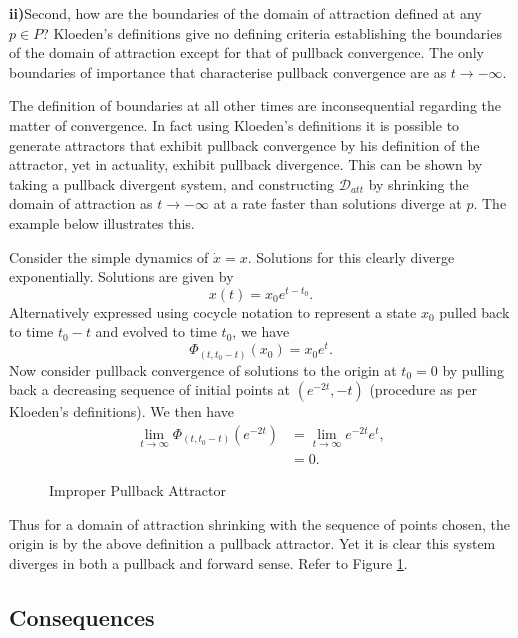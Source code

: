 \documentclass{article}
\begin{document}
\textbf{ii)}Second, how are the boundaries of the domain of attraction defined
at any $p \in P$? Kloeden's definitions give no defining criteria
establishing the boundaries of the domain of attraction except for that of
pullback convergence. The only boundaries of importance that characterise
pullback convergence are as $t \to -\infty$.

The definition of boundaries at all other times are
inconsequential regarding the matter of convergence. In fact using
Kloeden's definitions it is possible to generate attractors that
exhibit pullback convergence by his definition of the attractor,
yet in actuality, exhibit pullback divergence. This can be shown
by taking a pullback divergent system, and constructing
$\mathcal{D}_{att}$ by shrinking the domain of attraction as $t\to
-\infty$ at a rate faster than solutions diverge at $p$. The
example below illustrates this.

\begin{example}
\label{improperpaeg}
Consider the simple dynamics of $\dot{x} = x$. Solutions for this clearly
diverge exponentially. Solutions are given by
\[ x(t) = x_0 e^{t-t_0}. \]
Alternatively expressed using cocycle notation to represent a state $x_0$
pulled back to time $t_0 - t$ and evolved to time $t_0$, we have
\[ \Phi_{(t, t_0-t)}(x_0) = x_0 e^t. \]
Now consider pullback convergence of solutions to the origin at $t_0 =
0$ by pulling back a decreasing sequence of initial points at $(e^{-2t}, -t)$
(procedure as per Kloeden's definitions). We then have
\begin{align*}
  \lim_{t \to \infty} \Phi_{(t, t_0-t)}(e^{-2t}) &= \lim_{t \to \infty}
                    e^{-2t}e^t, \\
             &= 0.
\end{align*}
\begin{figure}
\begin{center}

\caption{Improper Pullback Attractor}
\protect\label{improperpafig}
\end{center}
\end{figure}
Thus for a domain of attraction shrinking with the sequence of points chosen,
the origin is by the above definition a pullback attractor. Yet it is clear this
system diverges in both a pullback and forward sense. Refer to Figure
\ref{improperpafig}.
\end{example}

\subsection{Consequences}
\end{document}
